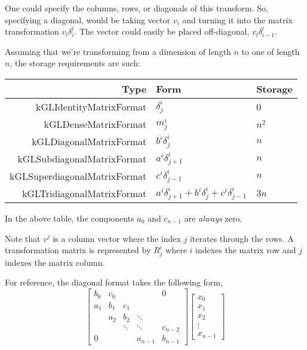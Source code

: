 \documentclass[11pt]{article}
\begin{document}
One could specify the columns, rows, or diagonals of this transform. So, specifying a diagonal, would be taking vector $v_i$ and turning it into the matrix transformation $v_l \delta^l_i$. The vector could easily be placed off-diagonal, $v_l \delta^l_{i-1}$.

Assuming that we're transforming from a dimension of length $n$ to one of length $n$, the storage requirements are such:

\begin{tabular}{r l l}
\hline
 Type & Form & Storage \\
\hline
  kGLIdentityMatrixFormat & $\delta^i_j$ & 0 \\
  kGLDenseMatrixFormat & $m^i_j$ & $n^2$  \\
  kGLDiagonalMatrixFormat & $b^i \delta^i_j$ & $n$ \\
  kGLSubdiagonalMatrixFormat & $a^i \delta^i_{j+1}$ & $n$ \\
  kGLSuperdiagonalMatrixFormat & $c^i \delta^i_{j-1}$ & $n$ \\
  kGLTridiagonalMatrixFormat & $a^i \delta^i_{j+1} + b^i \delta^i_j + c^i \delta^i_{j-1}$ & $3n$ \\
\hline
\end{tabular}

In the above table, the components $a_0$ and $c_{n-1}$ are \emph{always} zero.

Note that $v^j$ is a column vector where the index $j$ iterates through the rows. A transformation matrix is represented by $R^i_j$ where $i$ indexes the matrix row and $j$ indexes the matrix column.

For reference, the diagonal format takes the following form,
\begin{equation}
\left[\begin{array}{ccccc}b_0 & c_0 &  &  & 0 \\a_1 & b_1 & c_1 &  &  \\ & a_2 & b_2 & \ddots &  \\ &  & \ddots  & \ddots  & c_{n-2} \\0 &  &  & a_{n-1} & b_{n-1}\end{array}\right] \left[\begin{array}{c}x_0 \\x_1 \\x_2 \\ \vdots \\x_{n-1}\end{array}\right]
\end{equation}
\end{document}
